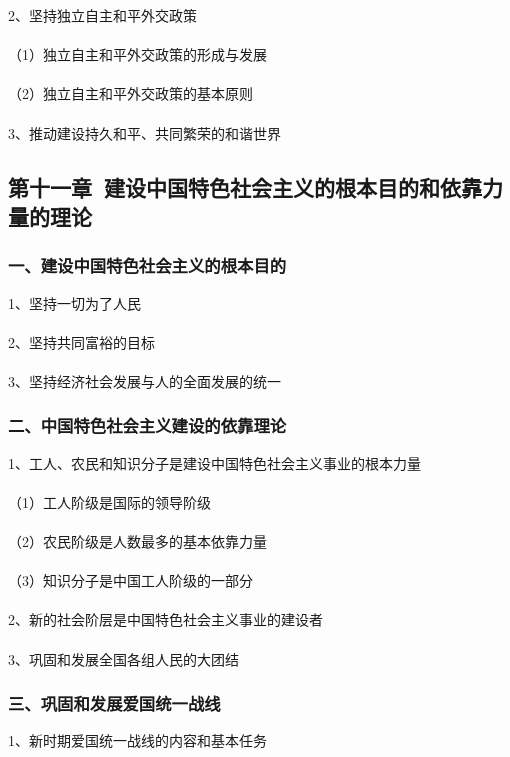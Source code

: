 \documentclass{ctexart}
\begin{document}
2、坚持独立自主和平外交政策
\\\\
（1）独立自主和平外交政策的形成与发展
\\\\
（2）独立自主和平外交政策的基本原则
\\\\

3、推动建设持久和平、共同繁荣的和谐世界


\subsection{第十一章\ 建设中国特色社会主义的根本目的和依靠力量的理论}
\subsubsection{一、建设中国特色社会主义的根本目的}
1、坚持一切为了人民
\\\\

2、坚持共同富裕的目标
\\\\

3、坚持经济社会发展与人的全面发展的统一

\subsubsection{二、中国特色社会主义建设的依靠理论}
1、工人、农民和知识分子是建设中国特色社会主义事业的根本力量
\\\\
（1）工人阶级是国际的领导阶级
\\\\
（2）农民阶级是人数最多的基本依靠力量
\\\\
（3）知识分子是中国工人阶级的一部分
\\\\

2、新的社会阶层是中国特色社会主义事业的建设者
\\\\

3、巩固和发展全国各组人民的大团结

\subsubsection{三、巩固和发展爱国统一战线}
1、新时期爱国统一战线的内容和基本任务
\\\\
\end{document}
